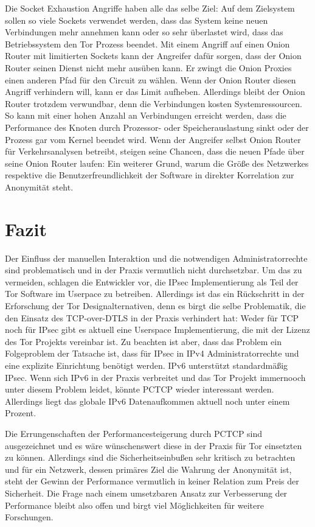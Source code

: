 \documentclass[fleqn,envcountsame,runningheads,10pt,a4paper]{llncs}
\begin{document}
Die Socket Exhaustion Angriffe haben alle das selbe Ziel: Auf dem Zielsystem 
sollen so viele Sockets verwendet werden, dass das System keine neuen 
Verbindungen mehr annehmen kann oder so sehr überlastet wird, dass das 
Betriebssystem den Tor Prozess beendet. Mit einem Angriff auf einen Onion Router 
mit limitierten Sockets kann der Angreifer dafür sorgen, dass der Onion Router 
seinen Dienst nicht mehr ausüben kann. Er zwingt die Onion Proxies einen anderen 
Pfad für den Circuit zu wählen. Wenn der Onion Router diesen Angriff verhindern 
will, kann er das Limit aufheben. Allerdings bleibt der Onion Router trotzdem 
verwundbar, denn die Verbindungen kosten  Systemressourcen. So kann mit einer 
hohen Anzahl an Verbindungen erreicht werden, dass die Performance des Knoten 
durch Prozessor- oder Speicherauslastung sinkt oder der Prozess gar vom Kernel 
beendet wird. Wenn der Angreifer selbst Onion Router für Verkehrsanalysen 
betreibt, steigen seine Chancen, dass die neuen Pfade über seine Onion Router 
laufen: Ein weiterer Grund, warum die Größe des Netzwerkes respektive die 
Benutzerfreundlichkeit der Software in direkter Korrelation zur Anonymität 
steht.
\section{Fazit}

Der Einfluss der manuellen Interaktion und die notwendigen Administratorrechte sind 
problematisch und in der Praxis vermutlich nicht durchsetzbar. Um das zu 
vermeiden, schlagen die Entwickler vor, die IPsec Implementierung als Teil der 
Tor Software im Userpace zu betreiben. Allerdings ist das ein Rückschritt in der 
Erforschung der Tor Designalternativen, denn es birgt die selbe Problematik, 
die den Einsatz des TCP-over-DTLS in der Praxis verhindert hat: Weder für TCP 
noch für IPsec gibt es aktuell eine Userspace Implementierung, die mit der 
Lizenz des Tor Projekts vereinbar ist. Zu beachten ist aber, dass das Problem 
ein Folgeproblem der Tatsache ist, dass für IPsec in IPv4 Administratorrechte und 
eine explizite Einrichtung benötigt werden. IPv6 unterstützt standardmäßig IPsec. Wenn
sich IPv6 in der Praxis verbreitet und das Tor Projekt immernooch unter diesem 
Problem leidet, könnte PCTCP wieder interessant werden. Allerdings liegt das 
globale IPv6 Datenaufkommen aktuell noch unter einem Prozent.

Die Errungenschaften der Performancesteigerung durch PCTCP sind ausgezeichnet 
und es wäre wünschenswert diese in der Praxis für Tor einsetzten zu können. 
Allerdings sind die Sicherheitseinbußen sehr kritisch zu betrachten und für ein 
Netzwerk, dessen primäres Ziel die Wahrung der Anonymität ist, steht der Gewinn 
der Performance vermutlich in keiner Relation zum Preis der Sicherheit. Die 
Frage nach einem umsetzbaren Ansatz zur Verbesserung der Performance bleibt also 
offen und birgt viel Möglichkeiten für weitere Forschungen.



\end{document}
